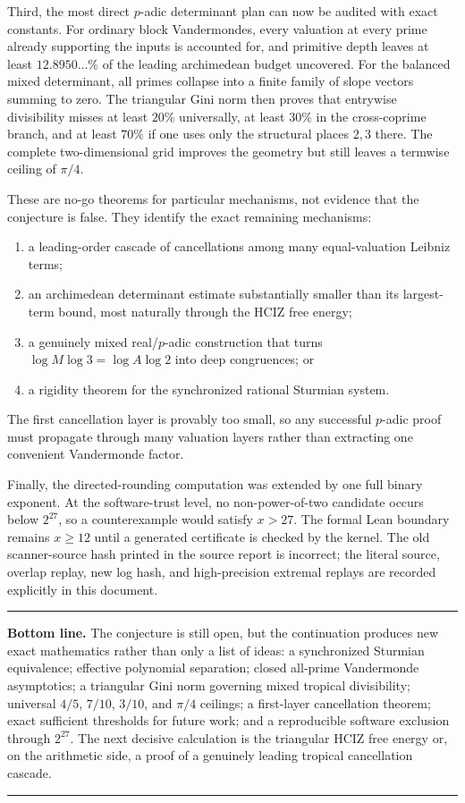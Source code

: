 \documentclass[11pt,oneside]{article}
\theoremstyle{definition}
\theoremstyle{remark}
\newenvironment{resultbox}
{\begin{center}\begin{minipage}{0.94\textwidth}\hrule\vspace{0.45em}}
{\vspace{0.35em}\hrule\end{minipage}\end{center}}
\begin{document}
Third, the most direct $p$-adic determinant plan can now be audited with exact constants.
For ordinary block Vandermondes, every valuation at every prime already supporting the inputs
is accounted for, and primitive depth leaves at least $12.8950\ldots\%$ of the leading
archimedean budget uncovered.  For the balanced mixed determinant, all primes collapse into a
finite family of slope vectors summing to zero.  The triangular Gini norm then proves that
entrywise divisibility misses at least $20\%$ universally, at least $30\%$ in the
cross-coprime branch, and at least $70\%$ if one uses only the structural places $2,3$ there.
The complete two-dimensional grid improves the geometry but still leaves a termwise ceiling
of $\pi/4$.

These are no-go theorems for particular mechanisms, not evidence that the conjecture is false.
They identify the exact remaining mechanisms:
\begin{enumerate}
\item a leading-order cascade of cancellations among many equal-valuation Leibniz terms;
\item an archimedean determinant estimate substantially smaller than its largest-term bound,
      most naturally through the HCIZ free energy;
\item a genuinely mixed real/$p$-adic construction that turns
      $\log M\log3=\log A\log2$ into deep congruences; or
\item a rigidity theorem for the synchronized rational Sturmian system.
\end{enumerate}
The first cancellation layer is provably too small, so any successful $p$-adic proof must
propagate through many valuation layers rather than extracting one convenient Vandermonde
factor.

Finally, the directed-rounding computation was extended by one full binary exponent.  At the
software-trust level, no non-power-of-two candidate occurs below $2^{27}$, so a counterexample
would satisfy $x>27$.  The formal Lean boundary remains $x\ge12$ until a generated certificate
is checked by the kernel.  The old scanner-source hash printed in the source report is
incorrect; the literal source, overlap replay, new log hash, and high-precision extremal
replays are recorded explicitly in this document.

\begin{resultbox}
\textbf{Bottom line.}
The conjecture is still open, but the continuation produces new exact mathematics rather than
only a list of ideas: a synchronized Sturmian equivalence; effective polynomial separation;
closed all-prime Vandermonde asymptotics; a triangular Gini norm governing mixed tropical
divisibility; universal $4/5$, $7/10$, $3/10$, and $\pi/4$ ceilings; a first-layer
cancellation theorem; exact sufficient thresholds for future work; and a reproducible
software exclusion through $2^{27}$.  The next decisive calculation is the triangular HCIZ
free energy or, on the arithmetic side, a proof of a genuinely leading tropical cancellation
cascade.
\end{resultbox}
\end{document}
